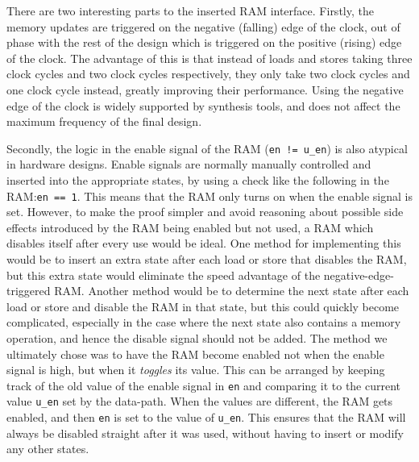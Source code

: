 There are two interesting parts to the inserted RAM interface.  Firstly, the
memory updates are triggered on the negative (falling) edge of the clock, out of
phase with the rest of the design which is triggered on the positive (rising)
edge of the clock.  The advantage of this is that instead of loads and stores
taking three clock cycles and two clock cycles respectively, they only take two
clock cycles and one clock cycle instead, greatly improving their
performance. %
Using the negative edge of the clock is widely supported by synthesis tools, and
does not affect the maximum frequency of the final design.

Secondly, the logic in the enable signal of the RAM (\texttt{en != u\_en}) is
also atypical in hardware designs.  Enable signals are normally manually
controlled and inserted into the appropriate states, by using a check like the
following in the RAM:\@ \texttt{en == 1}.  This means that the RAM only turns on
when the enable signal is set.  However, to make the proof simpler and avoid
reasoning about possible side effects introduced by the RAM being enabled but
not used, a RAM which disables itself after every use would be ideal.  One
method for implementing this would be to insert an extra state after each load
or store that disables the RAM, but this extra state would eliminate the speed
advantage of the negative-edge-triggered RAM. Another method would be to
determine the next state after each load or store and disable the RAM in that
state, but this could quickly become complicated, especially in the case where
the next state also contains a memory operation, and hence the disable signal
should not be added. The method we ultimately chose was to have the RAM become
enabled not when the enable signal is high, but when it \emph{toggles} its
value.  This can be arranged by keeping track of the old value of the enable
signal in \texttt{en} and comparing it to the current value \texttt{u\_en} set
by the data-path.  When the values are different, the RAM gets enabled, and then
\texttt{en} is set to the value of \texttt{u\_en}. This ensures that the RAM
will always be disabled straight after it was used, without having to insert or
modify any other states.

